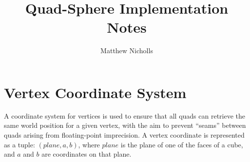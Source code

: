 \documentclass[a4paper]{article}
\begin{document}
  \setlength\parindent{0pt}

  \title{Quad-Sphere Implementation Notes}
  \author{Matthew Nicholls}
  \maketitle

  \section*{Vertex Coordinate System}
  A coordinate system for vertices is used to ensure that all quads can retrieve
  the same world position for a given vertex, with the aim to prevent ``seams''
  between quads arising from floating-point imprecision. A vertex coordinate is
  represented as a tuple: $ (\mathit{plane}, a, b) $, where $\mathit{plane}$ is
  the plane of one of the faces of a cube, and $a$ and $b$ are coordinates on that
  plane.
\end{document}
